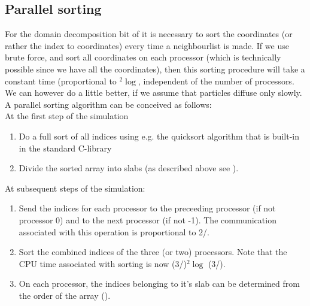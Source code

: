 \subsection{Parallel sorting}
\label{sec:parsort}
For the domain decomposition bit of {\gromacs} it is necessary to sort the 
coordinates (or rather the index to coordinates) every time a neighbourlist is made.
If we use brute force, and sort all coordinates on each processor (which is 
technically possible since we have all the coordinates), then this sorting procedure
will take a constant time (proportional to {\natom}$^2\log${\natom}, 
independent of the number of processors. We can however do a little
better, if we assume that particles diffuse only slowly.
A parallel sorting algorithm can be conceived as follows: \\
At the first step of the simulation
\begin{enumerate}
\item	Do a full sort of all indices using e.g. the  quicksort algorithm that is
	built-in in the standard C-library
\item	Divide the sorted array into slabs (as described above see 
	).
\end{enumerate}
At subsequent steps of the simulation:
\begin{enumerate}
\item	Send the indices for each processor to the preceeding processor (if
	not processor 0) and to the next processor (if not {\nproc}-1). The 
	communication associated with this operation is proportional to
	2{\natom}/{\nproc}.
\item	Sort the combined indices of the three (or two) processors. Note that
	the CPU time associated with sorting is now
	(3{\natom}/{\nproc})$^2\log$ (3{\natom}/{\nproc}).
\item	On each processor, the indices belonging to it's slab can be determined
	from the order of the array ().
\end{enumerate}

